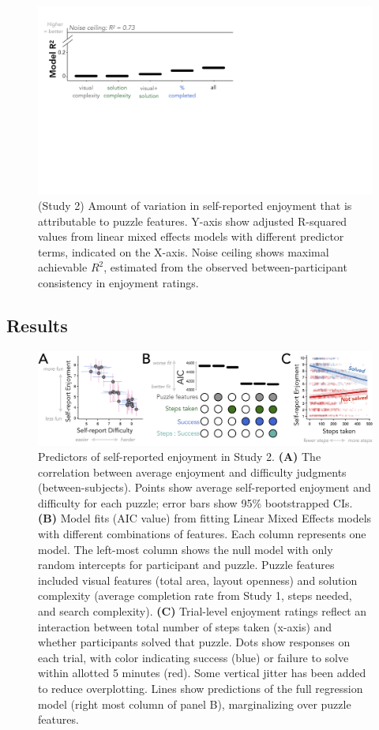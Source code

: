 \documentclass[10pt,letterpaper]{article}
\begin{document}
\begin{figure}[t!]
\includegraphics[width=.9\linewidth]{figures/fig4.pdf}
        \caption{(Study 2) Amount of variation in self-reported enjoyment that is attributable to puzzle features. Y-axis show adjusted R-squared values from linear mixed effects models with different predictor terms, indicated on the X-axis. Noise ceiling shows maximal achievable $R^2$, estimated from the observed between-participant consistency in enjoyment ratings.}
\label{exp2_rsq}
\end{figure}

\subsection{Results}

\begin{figure}[ht]
\includegraphics[width=\linewidth]{figures/fig5.jpg}
    \caption{Predictors of self-reported enjoyment in Study 2. 
    \textbf{(A)} The correlation between average enjoyment and difficulty judgments (between-subjects). Points show average self-reported enjoyment and difficulty for each puzzle; error bars show 95\% bootstrapped CIs. 
    \textbf{(B)} Model fits (AIC value) from fitting Linear Mixed Effects models with different combinations of features. Each column represents one model. The left-most column shows the null model with only random intercepts for participant and puzzle. Puzzle features included visual features (total area, layout openness) and solution complexity (average completion rate from Study 1, steps needed, and search complexity). 
    \textbf{(C)} Trial-level enjoyment ratings reflect an interaction between total number of steps taken (x-axis) and whether participants solved that puzzle. Dots show responses on each trial, with color indicating success (blue) or failure to solve within allotted 5 minutes (red). Some vertical jitter has been added to reduce overplotting. Lines show predictions of the full regression model (right most column of panel B), marginalizing over puzzle features.}
    \label{exp2_results}
\end{figure}
\end{document}

